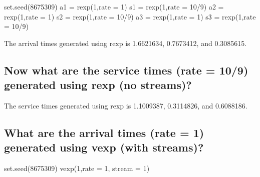 \documentclass[
]{article}
\newenvironment{Shaded}{\begin{snugshade}}{\end{snugshade}}
\newcommand{\AttributeTok}[1]{\textcolor[rgb]{0.77,0.63,0.00}{#1}}
\newcommand{\DecValTok}[1]{\textcolor[rgb]{0.00,0.00,0.81}{#1}}
\newcommand{\FunctionTok}[1]{\textcolor[rgb]{0.00,0.00,0.00}{#1}}
\newcommand{\NormalTok}[1]{#1}
\newcommand{\OtherTok}[1]{\textcolor[rgb]{0.56,0.35,0.01}{#1}}
\newcommand{\SpecialCharTok}[1]{\textcolor[rgb]{0.00,0.00,0.00}{#1}}
\begin{document}
\begin{Shaded}
\begin{Highlighting}[]
\FunctionTok{set.seed}\NormalTok{(}\DecValTok{8675309}\NormalTok{)}
\NormalTok{a1 }\OtherTok{=} \FunctionTok{rexp}\NormalTok{(}\DecValTok{1}\NormalTok{,}\AttributeTok{rate =} \DecValTok{1}\NormalTok{)}
\NormalTok{s1 }\OtherTok{=} \FunctionTok{rexp}\NormalTok{(}\DecValTok{1}\NormalTok{,}\AttributeTok{rate =} \DecValTok{10}\SpecialCharTok{/}\DecValTok{9}\NormalTok{)}
\NormalTok{a2 }\OtherTok{=} \FunctionTok{rexp}\NormalTok{(}\DecValTok{1}\NormalTok{,}\AttributeTok{rate =} \DecValTok{1}\NormalTok{)}
\NormalTok{s2 }\OtherTok{=} \FunctionTok{rexp}\NormalTok{(}\DecValTok{1}\NormalTok{,}\AttributeTok{rate =} \DecValTok{10}\SpecialCharTok{/}\DecValTok{9}\NormalTok{)}
\NormalTok{a3 }\OtherTok{=} \FunctionTok{rexp}\NormalTok{(}\DecValTok{1}\NormalTok{,}\AttributeTok{rate =} \DecValTok{1}\NormalTok{)}
\NormalTok{s3 }\OtherTok{=} \FunctionTok{rexp}\NormalTok{(}\DecValTok{1}\NormalTok{,}\AttributeTok{rate =} \DecValTok{10}\SpecialCharTok{/}\DecValTok{9}\NormalTok{)}
\end{Highlighting}
\end{Shaded}

The arrival times generated using rexp is 1.6621634, 0.7673412, and
0.3085615.

\hypertarget{now-what-are-the-service-times-rate-109-generated-using-rexp-no-streams}{%
\subsection{Now what are the service times (rate = 10/9) generated using
rexp (no
streams)?}\label{now-what-are-the-service-times-rate-109-generated-using-rexp-no-streams}}

The service times generated using rexp is 1.1009387, 0.3114826, and
0.6088186.

\hypertarget{what-are-the-arrival-times-rate-1-generated-using-vexp-with-streams}{%
\subsection{What are the arrival times (rate = 1) generated using vexp
(with
streams)?}\label{what-are-the-arrival-times-rate-1-generated-using-vexp-with-streams}}

\begin{Shaded}
\begin{Highlighting}[]
\FunctionTok{set.seed}\NormalTok{(}\DecValTok{8675309}\NormalTok{)}
\FunctionTok{vexp}\NormalTok{(}\DecValTok{1}\NormalTok{,}\AttributeTok{rate =} \DecValTok{1}\NormalTok{, }\AttributeTok{stream =} \DecValTok{1}\NormalTok{)}
\end{Highlighting}
\end{Shaded}
\end{document}
